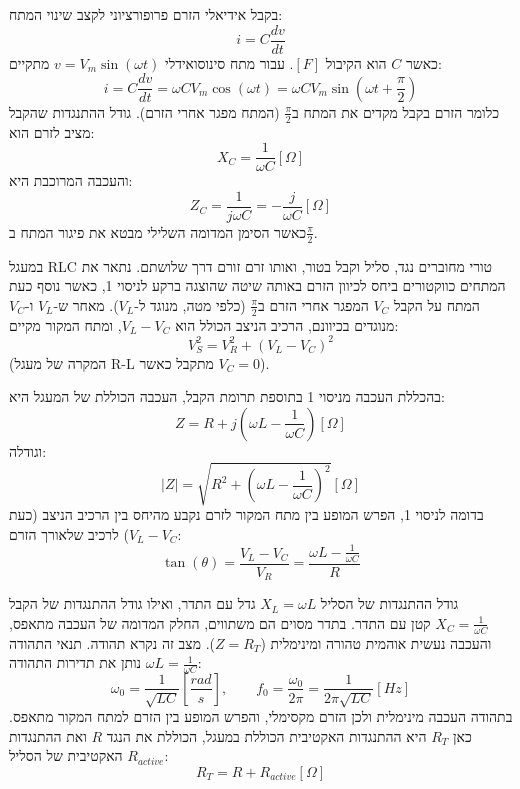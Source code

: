 \documentclass[14pt]{extarticle}
\begin{document}
בקבל אידיאלי הזרם פרופורציוני לקצב שינוי המתח:
\begin{equation}
    i = C \frac{dv}{dt}
\end{equation}
כאשר $C$ הוא הקיבול $[F]$.
עבור מתח סינוסואידלי $v = V_m \sin(\omega t)$ מתקיים:
\begin{equation}
    i = C \frac{dv}{dt} = \omega C V_m \cos(\omega t) = \omega C V_m \sin(\omega t + \frac{\pi}{2})
\end{equation}
כלומר הזרם בקבל מקדים את המתח ב$\frac{\pi}{2}$ (המתח מפגר אחרי הזרם).
גודל ההתנגדות שהקבל מציב לזרם הוא:
\begin{equation}
    X_C = \frac{1}{\omega C} [\Omega]
\end{equation}
והעכבה המרוכבת היא:
\begin{equation}
    Z_C = \frac{1}{j \omega C} = -\frac{j}{\omega C} [\Omega]
\end{equation}
כאשר הסימן המדומה השלילי מבטא את פיגור המתח ב$\frac{\pi}{2}$.

במעגל RLC טורי מחוברים נגד, סליל וקבל בטור, ואותו זרם זורם דרך שלושתם. נתאר את המתחים כווקטורים ביחס לכיוון הזרם באותה שיטה שהוצגה ברקע לניסוי 1, כאשר נוסף כעת המתח על הקבל $V_C$ המפגר אחרי הזרם ב$\frac{\pi}{2}$ (כלפי מטה, מנוגד ל-$V_L$). מאחר ש-$V_L$ ו-$V_C$ מנוגדים בכיוונם, הרכיב הניצב הכולל הוא $V_L - V_C$, ומתח המקור מקיים:
\begin{equation}
    V_S^2 = V_R^2 + (V_L - V_C)^2
\end{equation}
(המקרה של מעגל R-L מתקבל כאשר $V_C = 0$).

בהכללת העכבה מניסוי 1 בתוספת תרומת הקבל, העכבה הכוללת של המעגל היא:
\begin{equation}
    Z = R + j\left(\omega L - \frac{1}{\omega C}\right) [\Omega]
\end{equation}
וגודלה:
\begin{equation}
    |Z| = \sqrt{R^2 + \left(\omega L - \frac{1}{\omega C}\right)^2} [\Omega]
\end{equation}
בדומה לניסוי 1, הפרש המופע בין מתח המקור לזרם נקבע מהיחס בין הרכיב הניצב (כעת $V_L - V_C$) לרכיב שלאורך הזרם:
\begin{equation}
    \tan(\theta) = \frac{V_L - V_C}{V_R} = \frac{\omega L - \frac{1}{\omega C}}{R}
\end{equation}

גודל ההתנגדות של הסליל $X_L = \omega L$ גדל עם התדר, ואילו גודל ההתנגדות של הקבל $X_C = \frac{1}{\omega C}$ קטן עם התדר. בתדר מסוים הם משתווים, החלק המדומה של העכבה מתאפס, והעכבה נעשית אוהמית טהורה ומינימלית ($Z = R_T$). מצב זה נקרא תהודה. תנאי התהודה $\omega L = \frac{1}{\omega C}$ נותן את תדירות התהודה:
\begin{equation}
    \omega_0 = \frac{1}{\sqrt{LC}} \left[\frac{rad}{s}\right], \qquad f_0 = \frac{\omega_0}{2\pi} = \frac{1}{2\pi\sqrt{LC}} [Hz]
\end{equation}
בתהודה העכבה מינימלית ולכן הזרם מקסימלי, והפרש המופע בין הזרם למתח המקור מתאפס. כאן $R_T$ היא ההתנגדות האקטיבית הכוללת במעגל, הכוללת את הנגד $R$ ואת ההתנגדות האקטיבית של הסליל $R_{active}$:
\begin{equation}
    R_T = R + R_{active} [\Omega]
\end{equation}
\end{document}
